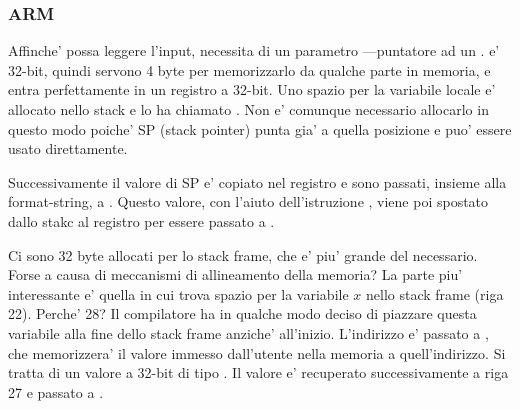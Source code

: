 \subsubsection{ARM}

\myparagraph{\OptimizingKeilVI (\ThumbMode)}



\myindex{\CLanguageElements!\Pointers}

Affinche' \scanf possa leggere l'input, necessita di un parametro ---puntatore ad un \Tint.
\Tint e' 32-bit, quindi servono 4 byte per memorizzarlo da qualche parte in memoria, e entra perfettamente in un registro a 32-bit.
Uno spazio per la variabile locale  e' allocato nello stack e \IDA
lo ha chiamato . Non e' comunque necessario allocarlo in questo modo poiche' \ac{SP} (\gls{stack pointer}) punta gia' a quella posizione e puo' essere usato direttamente.

Successivamente il valore di \ac{SP} e' copiato nel registro  e sono passati, insieme alla format-string, a \scanf.
Questo valore, con l'aiuto dell'istruzione  , viene poi spostato dallo stakc al registro  per essere passato a \printf.




Ci sono 32 byte allocati per lo stack frame, che e' piu' grande del necessario. Forse a causa di meccanismi di allineamento della memoria?
La parte piu' interessante e' quella in cui trova spazio per la variabile $x$ nello stack frame (riga 22).
Perche' 28? Il compilatore ha in qualche modo deciso di piazzare questa variabile alla fine dello stack frame anziche' all'inizio.
L'indirizzo e' passato a \scanf, che memorizzera' il valore immesso dall'utente nella memoria a quell'indirizzo.
Si tratta di un valore a 32-bit di tipo \Tint.
Il valore e' recuperato successivamente a riga 27 e passato a \printf.


